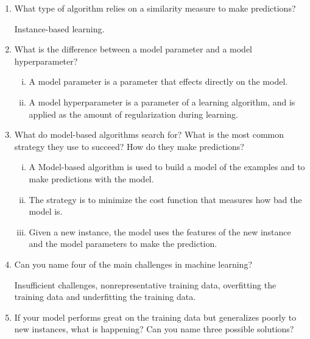 \documentclass[12pt,reqno]{amsart}
\newif\ifanswer
\begin{document}
\begin{enumerate}[1.]
\item What type of algorithm relies on a similarity measure to make predictions?

\ifanswer
{}
Instance-based learning.
\vspace{1cm}



\item What is the difference between a model parameter and a model hyperparameter?

\ifanswer
{}
\begin{enumerate}[(i)]
\item A model parameter is a parameter that effects directly on the model.
\item A model hyperparameter is a parameter of a learning algorithm,
and is applied as the amount of regularization during learning.
\end{enumerate}
\vspace{1cm}



\item What do model-based algorithms search for? What is the most common strategy they use to succeed? How do they make predictions?

\ifanswer
{}
\begin{enumerate}[(i)]
\item A Model-based algorithm is used to build a model of the examples and to make predictions with the model.
\item The strategy is to minimize the cost function that measures how bad the model is.
\item Given a new instance, the model uses the features of the new instance and the model parameters to make the prediction.
\end{enumerate}
\vspace{1cm}



\item Can you name four of the main challenges in machine learning?

\ifanswer
{}
Insufficient challenges, nonrepresentative training data, overfitting the training data and
underfitting the training data.
\vspace{1cm}



\item If your model performs great on the training data but generalizes poorly to new instances, what is happening? Can you name three possible solutions?


\end{enumerate}
\end{document}
